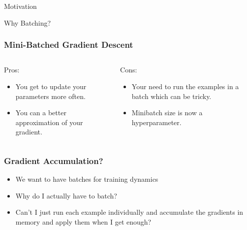 \documentclass{beamer}
\begin{document}
\begin{section}{Motivation}
\begin{subsection}{Why Batching?}
        \begin{frame}
            \frametitle{Mini-Batched Gradient Descent}
            \begin{columns}
                \begin{column}{0.5\textwidth}
                    Pros:
                    \begin{itemize}
                        \item You get to update your parameters more often.
                        \item You can a better approximation of your gradient.
                    \end{itemize}
                \end{column}
                \begin{column}{0.5\textwidth}
                    Cons:
                    \begin{itemize}
                        \item Your need to run the examples in a batch which can be tricky.
                        \item Minibatch size is now a hyperparameter.
                    \end{itemize}
                \end{column}
            \end{columns}
        \end{frame}

        \begin{frame}
            \frametitle{Gradient Accumulation?}
            \begin{itemize}
                \item We want to have batches for training dynamics
                \item Why do I actually have to batch?
                \item Can't I just run each example individually and accumulate the gradients in memory and apply them
                    when I get enough?
            \end{itemize}
        \end{frame}


\end{subsection}
\end{section}
\end{document}
